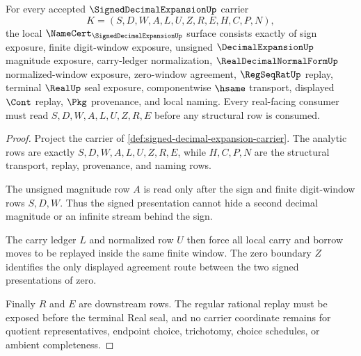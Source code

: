 \begin{theorem}
\label{thm:signed-decimal-expansion-namecert-obligations}
For every accepted $\SignedDecimalExpansionUp$ carrier
$$
K=(S,D,W,A,L,U,Z,R,E,H,C,P,N),
$$
the local $\NameCert_{\SignedDecimalExpansionUp}$ surface consists exactly of sign exposure, finite digit-window exposure, unsigned $\DecimalExpansionUp$ magnitude exposure, carry-ledger normalization, $\RealDecimalNormalFormUp$ normalized-window exposure, zero-window agreement, $\RegSeqRatUp$ replay, terminal $\RealUp$ seal exposure, componentwise $\hsame$ transport, displayed $\Cont$ replay, $\Pkg$ provenance, and local naming. Every real-facing consumer must read $S,D,W,A,L,U,Z,R,E$ before any structural row is consumed.
\end{theorem}
\begin{proof}
Project the carrier of \autoref{def:signed-decimal-expansion-carrier}. The analytic rows are exactly $S,D,W,A,L,U,Z,R,E$, while $H,C,P,N$ are the structural transport, replay, provenance, and naming rows.

The unsigned magnitude row $A$ is read only after the sign and finite digit-window rows $S,D,W$. Thus the signed presentation cannot hide a second decimal magnitude or an infinite stream behind the sign.

The carry ledger $L$ and normalized row $U$ then force all local carry and borrow moves to be replayed inside the same finite window. The zero boundary $Z$ identifies the only displayed agreement route between the two signed presentations of zero.

Finally $R$ and $E$ are downstream rows. The regular rational replay must be exposed before the terminal Real seal, and no carrier coordinate remains for quotient representatives, endpoint choice, trichotomy, choice schedules, or ambient completeness.
\end{proof}

